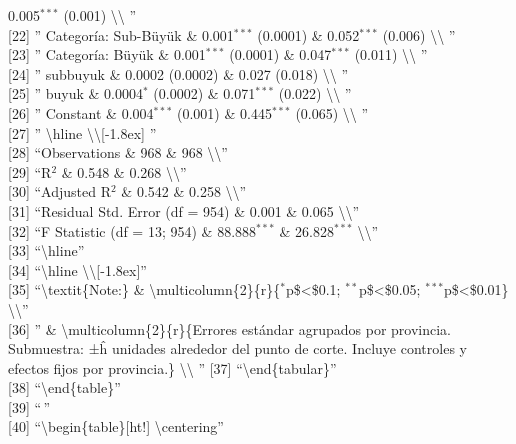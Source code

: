 \documentclass[
]{article}
\begin{document}
0.005\(^{***}\) (0.001) \textbackslash\textbackslash{} ''\\
{[}22{]} '' Categoría: Sub-Büyük \& 0.001\(^{***}\) (0.0001) \&
0.052\(^{***}\) (0.006) \textbackslash\textbackslash{} ''\\
{[}23{]} '' Categoría: Büyük \& 0.001\(^{***}\) (0.0001) \&
0.047\(^{***}\) (0.011) \textbackslash\textbackslash{} ''\\
{[}24{]} '' subbuyuk \& 0.0002 (0.0002) \& 0.027 (0.018)
\textbackslash\textbackslash{} ''\\
{[}25{]} '' buyuk \& 0.0004\(^{*}\) (0.0002) \& 0.071\(^{***}\) (0.022)
\textbackslash\textbackslash{} ''\\
{[}26{]} '' Constant \& 0.004\(^{***}\) (0.001) \& 0.445\(^{***}\)
(0.065) \textbackslash\textbackslash{} ''\\
{[}27{]} '' \textbackslash hline
\textbackslash\textbackslash{[}-1.8ex{]} ''\\
{[}28{]} ``Observations \& 968 \& 968 \textbackslash\textbackslash{}''\\
{[}29{]} ``R\(^{2}\) \& 0.548 \& 0.268
\textbackslash\textbackslash{}''\\
{[}30{]} ``Adjusted R\(^{2}\) \& 0.542 \& 0.258
\textbackslash\textbackslash{}''\\
{[}31{]} ``Residual Std. Error (df = 954) \& 0.001 \& 0.065
\textbackslash\textbackslash{}''\\
{[}32{]} ``F Statistic (df = 13; 954) \& 88.888\(^{***}\) \&
26.828\(^{***}\) \textbackslash\textbackslash{}''\\
{[}33{]} ``\textbackslash hline''\\
{[}34{]} ``\textbackslash hline
\textbackslash\textbackslash{[}-1.8ex{]}''\\
{[}35{]} ``\textbackslash textit\{Note:\} \&
\textbackslash multicolumn\{2\}\{r\}\{\(^{*}\)p\$\textless\$0.1;
\(^{**}\)p\$\textless\$0.05; \(^{***}\)p\$\textless\$0.01\}
\textbackslash\textbackslash{}''\\
{[}36{]} '' \& \textbackslash multicolumn\{2\}\{r\}\{Errores estándar
agrupados por provincia. Submuestra: ±ĥ unidades alrededor del punto de
corte. Incluye controles y efectos fijos por provincia.\}
\textbackslash\textbackslash{} '' {[}37{]}
``\textbackslash end\{tabular\}''\\
{[}38{]} ``\textbackslash end\{table\}''\\
{[}39{]} ``\,''\\
{[}40{]} ``\textbackslash begin\{table\}{[}ht!{]}
\textbackslash centering''\\
\end{document}
